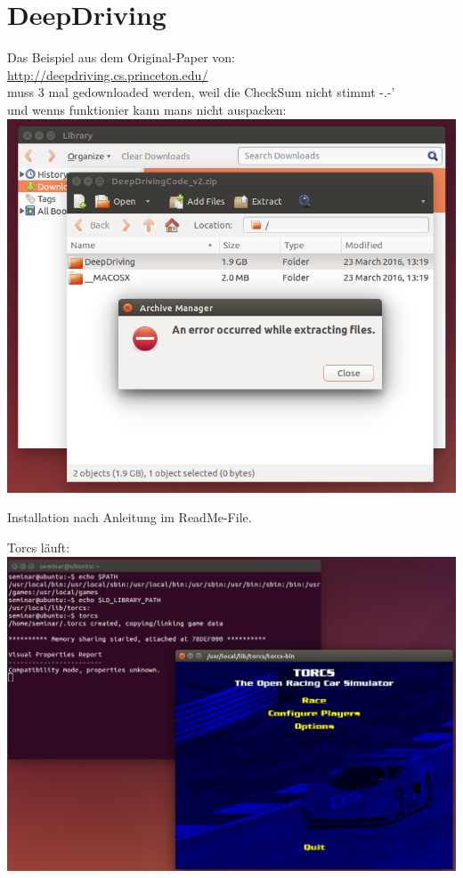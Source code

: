 \documentclass[11pt]{article}
\begin{document}
\section{DeepDriving}
Das Beispiel aus dem Original-Paper von:\\
\url{http://deepdriving.cs.princeton.edu/}\\
muss 3 mal gedownloaded werden, weil die CheckSum nicht stimmt -.-'\\
und wenns funktionier kann mans nicht auspacken:\\
\includegraphics[scale=0.8]{cant-extract.PNG}

Installation nach Anleitung im ReadMe-File. 

Torcs läuft:\\
\includegraphics[scale=0.6]{torcs-proof.PNG}
\end{document}
